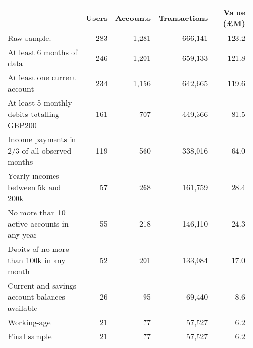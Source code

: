 \begin{tabular}{lrrrr}
\toprule
                                               & Users & Accounts & Transactions & Value (\pounds M) \\
\midrule
                                   Raw sample. &   283 &    1,281 &      666,141 &             123.2 \\
                     At least 6 months of data &   246 &    1,201 &      659,133 &             121.8 \\
                  At least one current account &   234 &    1,156 &      642,665 &             119.6 \\
    At least 5 monthly debits totalling GBP200 &   161 &      707 &      449,366 &              81.5 \\
 Income payments in 2/3 of all observed months &   119 &      560 &      338,016 &              64.0 \\
            Yearly incomes between 5k and 200k &    57 &      268 &      161,759 &              28.4 \\
   No more than 10 active accounts in any year &    55 &      218 &      146,110 &              24.3 \\
      Debits of no more than 100k in any month &    52 &      201 &      133,084 &              17.0 \\
Current and savings account balances available &    26 &       95 &       69,440 &               8.6 \\
                                   Working-age &    21 &       77 &       57,527 &               6.2 \\
                                  Final sample &    21 &       77 &       57,527 &               6.2 \\
\bottomrule
\end{tabular}
